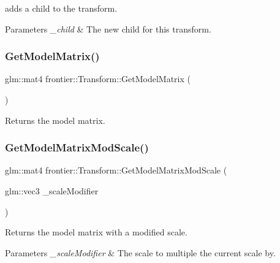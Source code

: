 adds a child to the transform. 


\begin{DoxyParams}{Parameters}
{\em \+\_\+child} & The new child for this transform. \\
\hline
\end{DoxyParams}
\mbox{\label{classfrontier_1_1_transform_a092823a36448cf201cc63e3cd46d6cc4}} 
\subsubsection{\texorpdfstring{Get\+Model\+Matrix()}{GetModelMatrix()}}
{\footnotesize\ttfamily glm\+::mat4 frontier\+::\+Transform\+::\+Get\+Model\+Matrix (\begin{DoxyParamCaption}{ }\end{DoxyParamCaption})}



Returns the model matrix. 

\mbox{\label{classfrontier_1_1_transform_aad5a62d25417a16ad84d6f809eebc8fe}} 
\subsubsection{\texorpdfstring{Get\+Model\+Matrix\+Mod\+Scale()}{GetModelMatrixModScale()}}
{\footnotesize\ttfamily glm\+::mat4 frontier\+::\+Transform\+::\+Get\+Model\+Matrix\+Mod\+Scale (\begin{DoxyParamCaption}\item[{glm\+::vec3}]{\+\_\+scale\+Modifier }\end{DoxyParamCaption})}



Returns the model matrix with a modified scale. 


\begin{DoxyParams}{Parameters}
{\em \+\_\+scale\+Modifier} & The scale to multiple the current scale by. \\
\hline
\end{DoxyParams}
\mbox{\label{classfrontier_1_1_transform_a9807f56b882736521e5678853e8a09c5}} 
